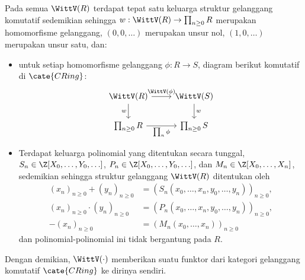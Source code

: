 \begin{theorem}\label{prop:Witt-ring}
	Pada semua $\WittV(R)$ terdapat tepat satu keluarga struktur gelanggang komutatif sedemikian sehingga $w: \WittV(R) \to \prod_{n \geq 0} R$ merupakan homomorfisme gelanggang, $(0, 0, \ldots)$ merupakan unsur nol, $(1, 0, \ldots)$ merupakan unsur satu, dan:
	\begin{itemize}
		\item untuk setiap homomorfisme gelanggang $\phi: R \to S$, diagram berikut komutatif di $\cate{CRing}$:
		\[\begin{tikzcd}
		\WittV(R) \arrow[d, "w"'] \arrow[r, "\WittV(\phi)"] & \WittV(S) \arrow[d, "w"] \\
		\prod_{n \geq 0} R \arrow[r, "\prod_n \phi"'] & \prod_{n \geq 0} S
		\end{tikzcd}\]
		\item Terdapat keluarga polinomial yang ditentukan secara tunggal, $S_n \in \Z[X_0, \ldots, Y_0, \ldots]$, $P_n \in \Z[X_0, \ldots, Y_0, \ldots]$, dan $M_n \in \Z[X_0, \ldots, X_n]$, sedemikian sehingga struktur gelanggang $\WittV(R)$ ditentukan oleh
		\begin{align*}
			(x_n)_{n \geq 0} + (y_n)_{n \geq 0} & = (S_n(x_0, \ldots, x_n, y_0, \ldots, y_n))_{n \geq 0}, \\
			(x_n)_{n \geq 0} \cdot (y_n)_{n \geq 0} & = (P_n(x_0, \ldots, x_n, y_0, \ldots, y_n))_{n \geq 0}, \\
			-(x_n)_{n \geq 0} & = (M_n(x_0, \ldots, x_n))_{n \geq 0}
		\end{align*}
		dan polinomial-polinomial ini tidak bergantung pada $R$.
	\end{itemize}
	Dengan demikian, $\WittV(\cdot)$ memberikan suatu funktor dari kategori gelanggang komutatif $\cate{CRing}$ ke dirinya sendiri.
\end{theorem}
